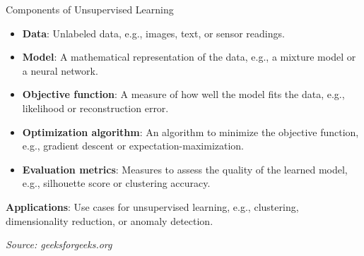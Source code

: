 \begin{frame}[allowframebreaks]{Components of Unsupervised Learning}
\begin{itemize}
    \item \textbf{Data}: Unlabeled data, e.g., images, text, or sensor readings.
    \item \textbf{Model}: A mathematical representation of the data, e.g., a mixture model or a neural network.
    \item \textbf{Objective function}: A measure of how well the model fits the data, e.g., likelihood or reconstruction error.
    \item \textbf{Optimization algorithm}: An algorithm to minimize the objective function, e.g., gradient descent or expectation-maximization.
    \item \textbf{Evaluation metrics}: Measures to assess the quality of the learned model, e.g., silhouette score or clustering accuracy.
\end{itemize}
\vspace{1em}
\textbf{Applications}: Use cases for unsupervised learning, e.g., clustering, dimensionality reduction, or anomaly detection.

\framebreak

{\small \textit{Source: geeksforgeeks.org}}
\end{frame}

